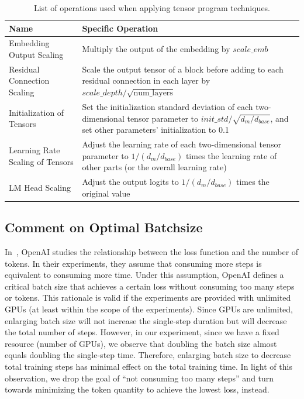 \documentclass[dvipsnames]{article}
\begin{document}
\begin{table}[h]
\centering
\begin{tabular}{l|p{8cm}}
\toprule
\textbf{Name}                       & \textbf{Specific Operation}                                                                                                                 \\ \midrule
Embedding Output Scaling            & Multiply the output of the embedding by $scale\_{emb}$                                                                                                                                                     \\ \hline
Residual Connection Scaling         & Scale the output tensor of a block before adding to each residual connection in each layer by $scale\_{depth}/\sqrt{\text{num\_layers}}$ 
\\ \hline
Initialization of Tensors           & Set the initialization standard deviation of each two-dimensional tensor parameter to $init\_std/\sqrt{d_m/d_{base}}$, and set other parameters' initialization to 0.1                  \\ \hline
Learning Rate Scaling of Tensors    & Adjust the learning rate of each two-dimensional tensor parameter to $1/({d_m/d_{base}}) $ times the learning rate of other parts (or the overall learning rate)                    \\ \hline
LM Head Scaling                    & Adjust the output logits to $1/(d_m/d_{base})$ times the original value                                                                                                           \\ \bottomrule
\end{tabular}
\caption{List of operations used when applying tensor program techniques.}
\label{tab:mup}
\end{table}

\subsection{Comment on Optimal Batchsize}
\label{app:batchsize}
In~\cite{kaplan2020scaling}, OpenAI studies the relationship between the loss function and the number of tokens. In their experiments, they assume that consuming more steps is equivalent to consuming more time. Under this assumption, OpenAI defines a critical batch size that achieves a certain loss without consuming too many steps or tokens. This rationale is valid if the experiments are provided with unlimited GPUs (at least within the scope of the experiments). Since GPUs are unlimited, enlarging batch size will not increase the single-step duration but will decrease the total number of steps. However, in our experiment, since we have a fixed resource (number of GPUs), we observe that doubling the batch size almost equals doubling the single-step time. Therefore, enlarging batch size to decrease total training steps has minimal effect on the total training time. In light of this observation, we drop the goal of ``not consuming too many steps'' and turn towards minimizing the token quantity to achieve the lowest loss, instead.
\end{document}
